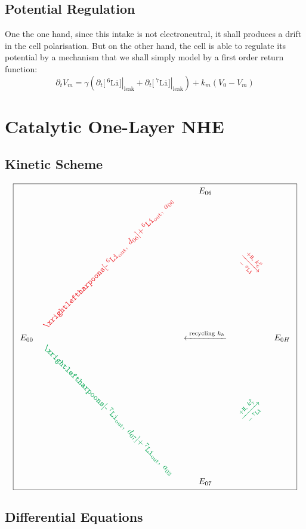 \documentclass[aps,onecolumn,11pt]{revtex4}
\newcommand{\mychem}[1]{\mathtt{#1}}
\newcommand{\myconc}[1]{\big[#1\big]}
\newcommand{\spLi}[1]{{\!~^{#1}\mychem{Li}}}
\newcommand{\Li}[1]{\myconc{\spLi{#1}}}
\newcommand{\spproton}{\mychem{H}}
\newcommand{\myleak}[1]{\left.{#1}\right\vert_{\mathrm{leak}}}
\newcommand{\myout}[1]{{#1}_{\mathrm{out}}}
\newcommand{\spLiOut}[1]{\myout{\spLi{#1}}}
\newcommand{\myrotate}[2]{\rotatebox[origin=c]{#1}{#2}}
\newcommand{\outLi}[1]{\text{-}\spLiOut{#1}}
\newcommand{\mycolor}[2]{\ifthenelse{\equal{#1}{6}}{{\color{Red}#2}}{{\color{Green}#2}}}
\begin{document}
\subsection{Potential Regulation}
One the one hand, since this intake is not electroneutral, it shall produces a drift in the cell polarisation. But on the other hand, the cell is able to regulate its potential 
by a mechanism that we shall simply model by a first order return function:
\begin{equation}
	\partial_t V_m = \gamma \left( \partial_t \myleak{\Li{6}} + \partial_t \myleak{\Li{7}} \right) + k_m \left(V_0-V_m\right)
\end{equation}

\section{Catalytic One-Layer NHE}

\subsection{Kinetic Scheme}
{
\Large
\begin{equation}
\boxed{
\begin{array}{ccccc}
 & & E_{06}  &  & \\
 &  \mycolor{6}{\myrotate{45}{$\xrightleftharpoons[\outLi{6},\;d_{06}]{+\spLiOut{6},\;a_{06}}$}} &   & \mycolor{6}{\myrotate{-45}{$\xrightarrow[-\spLi{6}]{+ \spproton, \; k^p_6}$}} &  \\
E_{00}  &  & \xleftarrow{\text{ recycling } k_h } &   & E_{0H} \\
  & \mycolor{7}{\myrotate{-45}{$\xrightleftharpoons[\outLi{7},\;d_{07}]{+\spLiOut{7},\;a_{02}}$}} &   & \mycolor{7}{\myrotate{+45}{$\xrightarrow[-\spLi{7}]{+ \spproton, \; k^p_7}$}} & \\
 & & E_{07} & & \\
 \end{array}
 }
\end{equation}
}

\subsection{Differential Equations}
\end{document}

